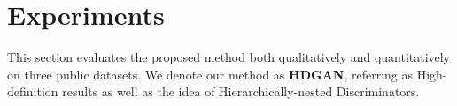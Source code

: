 \documentclass[10pt,twocolumn,letterpaper]{article}
\begin{document}
%			

\section{Experiments}
This section evaluates the proposed method both qualitatively and quantitatively on three public datasets. We denote our method as \textbf{HDGAN}, referring as High-definition results as well as the idea of Hierarchically-nested Discriminators.
\end{document}
